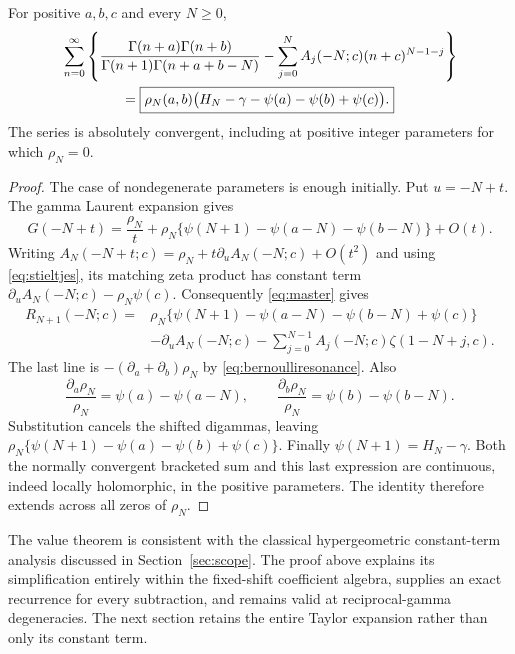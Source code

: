 \begin{theorem}\label{thm:resonant}
For positive $a,b,c$ and every $N\ge0$,
\begin{align}
 &\sum_{n=0}^\infty\left\{
 \frac{\Gamma(n+a)\Gamma(n+b)}
      {\Gamma(n+1)\Gamma(n+a+b-N)}
 -\sum_{j=0}^{N}A_j(-N;c)(n+c)^{N-1-j}\right\}\notag\\
 &\hspace{15mm}=
 \boxed{\rho_N(a,b)
 \bigl(H_N-\gamma-\psi(a)-\psi(b)+\psi(c)\bigr).}
 \label{eq:closedresonance}
\end{align}
The series is absolutely convergent, including at positive integer
parameters for which $\rho_N=0$.
\end{theorem}
\begin{proof}
The case of nondegenerate parameters is enough initially.  Put $u=-N+t$.
The gamma Laurent expansion gives
\[
 G(-N+t)=\frac{\rho_N}{t}+
 \rho_N\{\psi(N+1)-\psi(a-N)-\psi(b-N)\}+O(t).
\]
Writing $A_N(-N+t;c)=\rho_N+t\partial_uA_N(-N;c)+O(t^2)$
and using \eqref{eq:stieltjes}, its matching zeta product has constant term
$\partial_uA_N(-N;c)-\rho_N\psi(c)$.
Consequently \eqref{eq:master} gives
\begin{align*}
 R_{N+1}(-N;c)
 ={}&\rho_N\{\psi(N+1)-\psi(a-N)-\psi(b-N)+\psi(c)\}\\
 &-\partial_uA_N(-N;c)
 -\sum_{j=0}^{N-1}A_j(-N;c)\zeta(1-N+j,c).
\end{align*}
The last line is $-(\partial_a+\partial_b)\rho_N$ by
\eqref{eq:bernoulliresonance}.  Also
\[
 \frac{\partial_a\rho_N}{\rho_N}=
 \psi(a)-\psi(a-N),\qquad
 \frac{\partial_b\rho_N}{\rho_N}=
 \psi(b)-\psi(b-N).
\]
Substitution cancels the shifted digammas, leaving
$\rho_N\{\psi(N+1)-\psi(a)-\psi(b)+\psi(c)\}$.
Finally $\psi(N+1)=H_N-\gamma$.
Both the normally convergent bracketed sum and this last expression are
continuous, indeed locally holomorphic, in the positive parameters.
The identity therefore extends across all zeros of $\rho_N$.
\end{proof}

\begin{remark}
The value theorem is consistent with the classical hypergeometric
constant-term analysis discussed in Section~\ref{sec:scope}.  The proof
above explains its simplification entirely within the fixed-shift
coefficient algebra, supplies an exact recurrence for every subtraction,
and remains valid at reciprocal-gamma degeneracies.  The next section
retains the entire Taylor expansion rather than only its constant term.
\end{remark}

